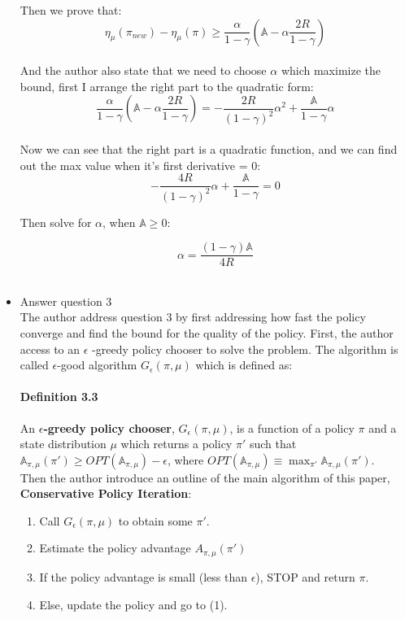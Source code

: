 \begin{itemize}
Then we prove that:
\[\eta_{\mu}(\pi_{new}) - \eta_{\mu}(\pi) \geq \frac{\alpha}{1 - \gamma}(\mathbb{A} - \alpha \frac{2R}{1 - \gamma})\]
\\

And the author also state that we need to choose $\alpha$ which maximize the bound, first I arrange the
right part to the quadratic form:
\[\frac{\alpha}{1 - \gamma}(\mathbb{A} - \alpha \frac{2R}{1 - \gamma}) = 
 - \frac{2R}{({1 - \gamma})^{2}} \alpha^{2} + \frac{\mathbb{A}}{1 - \gamma}\alpha \]
\\
 
Now we can see that the right part is a quadratic function, and we can find out the max value when it's
first derivative = 0:
\[- \frac{4R}{({1 - \gamma})^{2}} \alpha + \frac{\mathbb{A}}{1 - \gamma} = 0\]

Then solve for $\alpha$, when $\mathbb{A} \geq 0$:

\[ \alpha = \frac{(1 - \gamma)\mathbb{A}}{4R}\]
\\
\item Answer question 3 \\
The author address question 3 by first addressing how fast the policy converge and find the bound for
the quality of the policy.
First, the author access to an $\epsilon$ -greedy policy chooser to solve the problem. The algorithm
is called $\epsilon$-good algorithm $G_{\epsilon}(\pi, \mu)$ which is defined as:

\paragraph{Definition 3.3}
An \textbf{$\epsilon$-greedy policy chooser}, $G_{\epsilon}(\pi, \mu)$, is a function of a policy $\pi$
and a state distribution $\mu$ which returns a policy $\pi'$ such that $\mathbb{A}_{\pi,\mu}(\pi') \geq 
OPT(\mathbb{A}_{\pi,\mu}) - \epsilon$, where $OPT(\mathbb{A}_{\pi,\mu}) {\equiv} \max_{\pi'} \mathbb{A}_{\pi,\mu}(\pi')$. \\

Then the author introduce an outline of the main algorithm of this paper, \textbf{Conservative Policy Iteration}:\\
\begin{enumerate}[(1)]
\item Call $G_{\epsilon}(\pi, \mu)$ to obtain some $\pi'$. \\
\item Estimate the policy advantage $A_{\pi, \mu}(\pi')$ \\
\item If the policy advantage is small (less than $\epsilon$), STOP and return $\pi$. \\
\item Else, update the policy and go to (1). \\
\end{enumerate}


\end{itemize}
